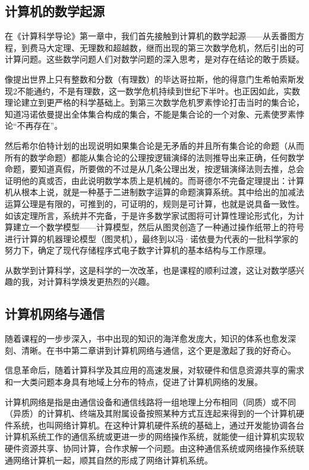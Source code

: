 \documentclass{article}
\begin{document}
\subsection{计算机的数学起源}
在《计算科学导论》第一章中，我们首先接触到计算机的数学起源——从丢番图方程，到费马大定理、无理数和超越数，继而出现的第三次数学危机，然后引出的可计算问题。这些数学问题人们对数学问题的深入思考，是对存在结论的敢于质疑。\par
像提出世界上只有整数和分数（有理数）的毕达哥拉斯，他的得意门生希帕索斯发现2不能通约，不是有理数，这一数学危机持续到世纪下半叶。也正因如此，实数理论建立到更严格的科学基础上。到第三次数学危机罗素悖论打击当时的集合论，知道冯诺依曼提出全体集合构成的集合，不能是集合论的一个对象、元素使罗素悖论“不再存在”。\par
然后希尔伯特计划的出现说明如果集合论是无矛盾的并且所有集合论的命题（从而所有的数学命题）都能从集合论的公理按逻辑演绎的法则推导出来正确，任何数学命题，要知道真假，所要做的不过是从几条公理出发，按逻辑演绎法则去推，总会证明他的真或否，由此说明数学本质上是机械的。而哥德尔不完备定理提出：计算机从根本上说，就是一种基于二进制数字运算的命题演算系统。其中给出的加减法运算公理是有限的，可推到的，可证明的，规则是可计算，也就是说具备一致性。如该定理所言，系统并不完备，于是许多数学家试图将可计算性理论形式化，为计算建立一个数学模型——计算模型，然后从图灵创造了一种通过操作纸带上的符号进行计算的机器理论模型（图灵机），最终到以冯·诺依曼为代表的一批科学家的努力下，确定了现代存储程序式电子数字计算机的基本结构与工作原理。\par
从数学到计算科学，这是科学的一次改革，也是课程的顺利过渡，这让对数学感兴趣的我，对计算科学焕发更热烈的兴趣。\par

\subsection{计算机网络与通信}
随着课程的一步步深入，书中出现的知识的海洋愈发庞大，知识的体系也愈发深刻、清晰。在书中第二章讲到计算机网络与通信，这个更是激起了我的好奇心。\par
信息革命后，随着计算科学及其应用的高速发展，对软硬件和信息资源共享的需求和一大类问题本身具有地域上分布的特点，促进了计算机网络的发展。\par
计算机网络是指是由通信设备和通信线路将一组地理上分布相同（同质）或不同（异质）的计算机、终端及其附属设备按照某种方式互连起来得到的一个计算机硬件系统，也叫网络计算机。在这种计算机硬件系统的基础上，通过开发能协调各台计算机系统工作的通信系统或更进一步的网络操作系统，就能使一组计算机实现软硬件资源共享、协同计算，合作求解一个问题。由这种通信系统或网络操作系统联通网络计算机一起，顺其自然的形成了网络计算机系统。\par
\end{document}
